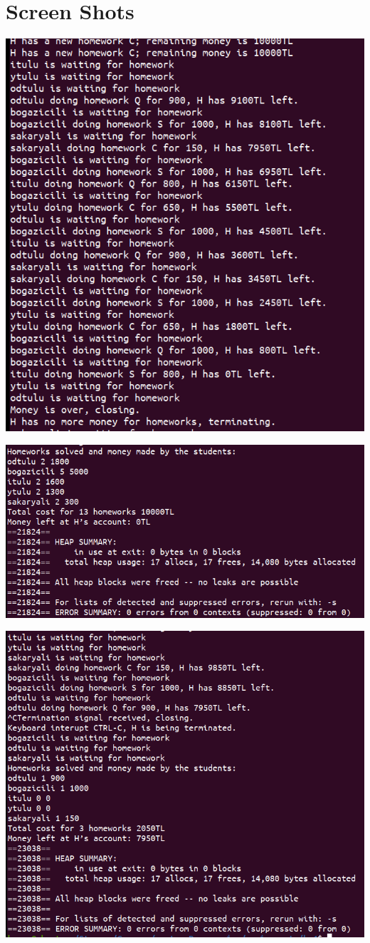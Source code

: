 \documentclass{article}
\begin{document}
\section*{Screen Shots}
\includegraphics[]{1.png}


\includegraphics[]{2.png}


\includegraphics[]{3.png}
\end{document}
